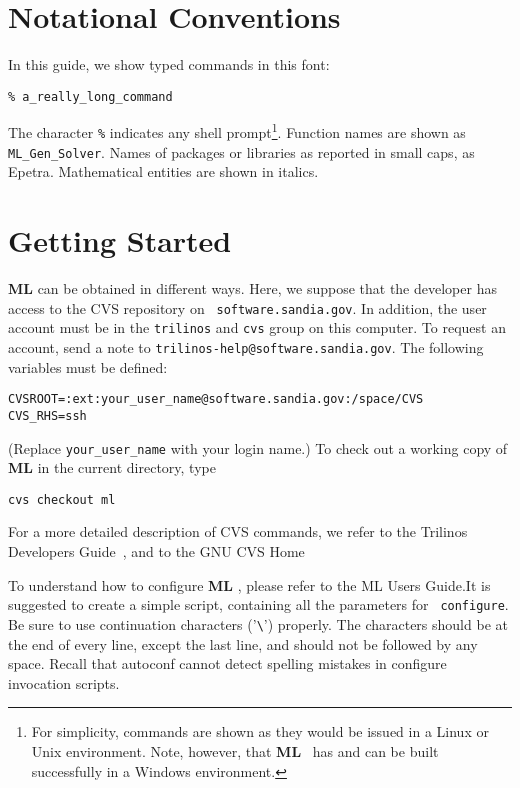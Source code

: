 \documentclass[10pt,letter,relax]{SANDreport}
\newcommand{\ML}     {{\bf ML }}
\begin{document}

\section{Notational Conventions}

In this guide, we show typed commands in this font:
\begin{verbatim}
% a_really_long_command
\end{verbatim}
The character \verb!%! indicates any shell prompt\footnote{For
  simplicity, commands are shown as they would be issued in a Linux or
  Unix environment.  Note, however, that \ML\ has and can be built
  successfully in a Windows environment.}.
Function names are shown as {\tt ML\_Gen\_Solver}.  Names of packages or
libraries as reported in small caps, as {\sc Epetra}. Mathematical
entities are shown in italics.


\section{Getting Started}
\label{sec:started}

\ML can be obtained in different ways. Here, we suppose that the
developer has access to the CVS repository on {\tt
  software.sandia.gov}. In addition, the user account must be in the
{\tt trilinos} and {\tt cvs} group on this computer. To request an
account, send a note to {\tt trilinos-help@software.sandia.gov}.  The
following variables must be defined:
\begin{verbatim}
CVSROOT=:ext:your_user_name@software.sandia.gov:/space/CVS
CVS_RHS=ssh
\end{verbatim}
(Replace \verb!your_user_name! with your login name.) To check out a
working copy of \ML in the current directory, type
\begin{verbatim}
cvs checkout ml
\end{verbatim}
For a more detailed description of CVS commands, we refer to the
Trilinos Developers Guide~\cite{Trilinos-Dev-Guide}, and to the GNU CVS Home

To understand how to configure \ML, please refer to the ML Users Guide.It is
suggested to create a simple script, containing all the parameters for {\tt
configure}. Be sure to use continuation characters ('\verb!\!') properly.
The characters should be at the end of every line, except the last line, and
should not be followed by any space.  Recall that autoconf cannot detect
spelling mistakes in configure invocation scripts.
\end{document}
